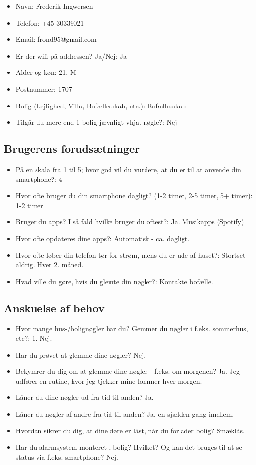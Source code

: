 \documentclass[a4paper,10pt]{article}
\begin{document}
\begin{itemize}
    \item Navn: Frederik Ingwersen
    \item Telefon: +45 30339021 
    \item Email: frond95@gmail.com
    \item Er der wifi på addressen? Ja/Nej: Ja
    \item Alder og køn: 21, M
    \item Postnummer: 1707
    \item Bolig (Lejlighed, Villa, Bofællesskab, etc.): Bofællesskab
    \item Tilgår du mere end 1 bolig jævnligt vhja. nøgle?: Nej
\end{itemize}


\subsection{Brugerens forudsætninger}

\begin{itemize}
    \item På en skala fra 1 til 5; hvor god vil du vurdere, at du er til at anvende din smartphone?: 4
    \item Hvor ofte bruger du din smartphone dagligt? (1-2 timer, 2-5 timer, 5+ timer): 1-2 timer
    \item Bruger du apps? I så fald hvilke bruger du oftest?: Ja. Musikapps (Spotify) 
    \item Hvor ofte opdateres dine apps?: Automatisk - ca. dagligt.
    \item Hvor ofte løber din telefon tør for strøm, mens du er ude af huset?: Stortset aldrig. Hver 2. måned. 
    \item Hvad ville du gøre, hvis du glemte din nøgler?: Kontakte bofælle.
\end{itemize}

\subsection{Anskuelse af behov}

\begin{itemize}
    \item Hvor mange hus-/bolignøgler har du? Gemmer du nøgler i f.eks. sommerhus, etc?: 1. Nej. 
    \item Har du prøvet at glemme dine nøgler? Nej.
    \item Bekymrer du dig om at glemme dine nøgler - f.eks. om morgenen? Ja. Jeg udfører en rutine, hvor jeg tjekker mine lommer hver morgen.
    \item Låner du dine nøgler ud fra tid til anden? Ja. 
    \item Låner du nøgler af andre fra tid til anden? Ja, en sjælden gang imellem.
    \item Hvordan sikrer du dig, at dine døre er låst, når du forlader bolig? Smæklås.
    \item Har du alarmsystem monteret i bolig? Hvilket? Og kan det bruges til at se status via f.eks. smartphone? Nej.
\end{itemize}
\end{document}

